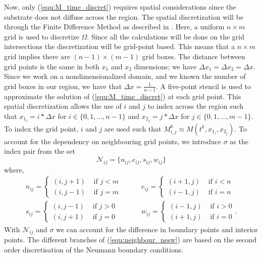 Now, only (\ref{equ:M_time_discret}) requires spatial considerations since the substrate does not diffuse across the region.
The spatial discretization will be through the Finite Difference Method as described in \cite{saad2003iterativeMethod}.
Here, a uniform $n \times m$ grid is used to discretize $\Omega$.
Since all the calculations will be done on the grid intersections the discretization will be grid-point based.
This means that a $n \times m$ grid implies there are $(n-1) \times (m-1)$ grid boxes.
The distance between grid points is the same in both $x_1$ and $x_2$ dimensions; we have $\Delta x_1 = \Delta x_2 = \Delta x$.
Since we work on a nondimensionalized domain, and we known the number of grid boxes in our region, we have that $\Delta x = \frac{1}{n-1}$.
A five-point stencil is used to approximate the solution of (\ref{equ:M_time_discret}) at each grid point.
This spatial discretization allows the use of $i$ and $j$ to index across the region such that $x_{1_i} = i * \Delta x$ for $i \in \{ 0, 1, \ldots, n-1 \}$ and $x_{2_j} = j * \Delta x$ for $j \in \{ 0, 1, \ldots, m-1 \}$.
To index the grid point, $i$ and $j$ are used such that $M^{k}_{i,j} \approx M(t^{k}, x_{1_i}, x_{2_j})$.
To account for the dependency on neighbouring grid points, we introduce $\sigma$ as the index pair from the set 
\begin{equation}\label{equ:neighbour}
  \mathcal{N}_{ij} = \{n_{ij}, e_{ij}, s_{ij}, w_{ij}\}
\end{equation}
where, 
\begin{equation} \label{equ:neighbour_nesw}
  \begin{aligned}
    n_{ij} = \begin{cases} 
      (i,j+1)  & \text{ if } j < m \\
      (i,j-1)  & \text{ if } j = m \end{cases}
    & \qquad 
    e_{ij} = \begin{cases}
      (i+1,j)  & \text{ if } i < n \\
      (i-1,j)  & \text{ if } i = n \end{cases}
    \\
    s_{ij} = \begin{cases}
      (i,j-1)  & \text{ if } j > 0 \\
      (i,j+1)  & \text{ if } j = 0 \end{cases}
    & \qquad 
    w_{ij} = \begin{cases}
      (i-1,j)  & \text{ if } i > 0\\
      (i+1,j)  & \text{ if } i = 0 \end{cases}.
  \end{aligned}
\end{equation}
With $\mathcal{N}_{ij}$ and $\sigma$ we can account for the difference in boundary points and interior points.
The different branches of (\ref{equ:neighbour_nesw}) are based on the second order discretisation of the Neumann boundary conditions. 

